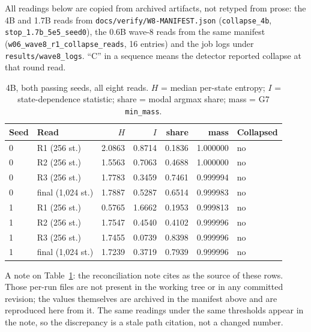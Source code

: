 \documentclass[11pt,a4paper]{article}
\begin{document}
All readings below are copied from archived artifacts, not retyped from prose: the 4B and 1.7B
reads from \texttt{docs/verify/W8-MANIFEST.json} (\texttt{collapse\_4b},
\texttt{stop\_1.7b\_5e5\_seed0}), the 0.6B wave-8 reads from the same manifest
(\texttt{w06\_wave8\_r1\_collapse\_reads}, 16 entries) and the job logs under
\texttt{results/wave8\_logs}. ``C'' in a sequence means the detector reported collapse at that
round read.

\begin{table}[h]
\centering
\small
\caption{4B, both passing seeds, all eight reads. $H$ = median per-state entropy;
$I$ = state-dependence statistic; share = modal argmax share; mass = G7 \texttt{min\_mass}.}
\label{tab:s2a}
\begin{tabular}{@{}llrrrrl@{}}
\toprule
\textbf{Seed} & \textbf{Read} & $H$ & $I$ & \textbf{share} & \textbf{mass} & \textbf{Collapsed} \\
\midrule
0 & R1 (256 st.) & 2.0863 & 0.8714 & 0.1836 & 1.000000 & no \\
0 & R2 (256 st.) & 1.5563 & 0.7063 & 0.4688 & 1.000000 & no \\
0 & R3 (256 st.) & 1.7783 & 0.3459 & 0.7461 & 0.999994 & no \\
0 & final (1{,}024 st.) & 1.7887 & 0.5287 & 0.6514 & 0.999983 & no \\
1 & R1 (256 st.) & 0.5765 & 1.6662 & 0.1953 & 0.999813 & no \\
1 & R2 (256 st.) & 1.7547 & 0.4540 & 0.4102 & 0.999996 & no \\
1 & R3 (256 st.) & 1.7455 & 0.0739 & 0.8398 & 0.999996 & no \\
1 & final (1{,}024 st.) & 1.7239 & 0.3719 & 0.7939 & 0.999996 & no \\
\bottomrule
\end{tabular}
\end{table}

\noindent A note on Table~\ref{tab:s2a}: the reconciliation note cites
 as the
source of these rows. Those per-run files are not present in the working tree or in any committed
revision; the values themselves are archived in the manifest above and are reproduced here from
it. The same readings under the same thresholds appear in the note, so the discrepancy is a stale
path citation, not a changed number.
\end{document}
